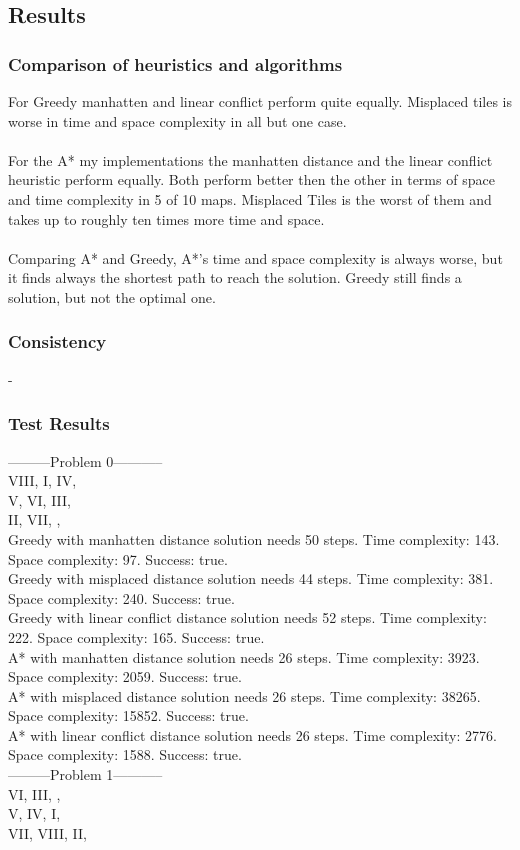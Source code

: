 \documentclass[paper=a4, fontsize=11pt]{scrartcl} %
\numberwithin{equation}{section} %
\numberwithin{figure}{section} %
\numberwithin{table}{section} %
\begin{document}
\subsection{Results}

\subsubsection{Comparison of heuristics and algorithms}
For Greedy manhatten and linear conflict perform quite equally. Misplaced tiles is worse in time and space complexity in all but one case.\\\\

For the A* my implementations the manhatten distance and the linear conflict heuristic perform equally. Both perform better then the other in terms of space and time complexity in 5 of 10 maps. Misplaced Tiles is the worst of them and takes up to roughly ten times more time and space.\\\\

Comparing A* and Greedy, A*'s time and space complexity is always worse, but it finds always the shortest path to reach the solution. Greedy still finds a solution, but not the optimal one.

\subsubsection{Consistency}
-

\subsubsection{Test Results}
---------Problem 0-----------\\
VIII, I, IV, \\
V, VI, III, \\
II, VII, , \\

Greedy with manhatten distance solution needs 50 steps. Time complexity: 143. Space complexity: 97. Success: true.\\
Greedy with misplaced distance solution needs 44 steps. Time complexity: 381. Space complexity: 240. Success: true.\\
Greedy with linear conflict distance solution needs 52 steps. Time complexity: 222. Space complexity: 165. Success: true.\\
A* with manhatten distance solution needs 26 steps. Time complexity: 3923. Space complexity: 2059. Success: true.\\
A* with misplaced distance solution needs 26 steps. Time complexity: 38265. Space complexity: 15852. Success: true.\\
A* with linear conflict distance solution needs 26 steps. Time complexity: 2776. Space complexity: 1588. Success: true.\\
---------Problem 1-----------\\
VI, III, , \\
V, IV, I, \\
VII, VIII, II,\\ 
\end{document}
